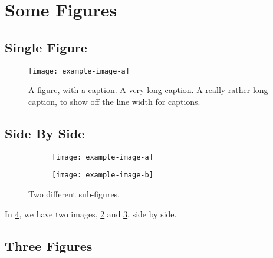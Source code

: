 
\section{Some Figures}

\subsection{Single Figure}

\begin{figure}[!ht]
	\centering
	\texttt{[image: example-image-a]}
	\caption{A figure, with a caption. A very long caption. A really rather long caption, to show off the line width for captions.}
	\label{fig1:single_image}
\end{figure}


\subsection{Side By Side}

\begin{figure}[!ht]
	\centering
	\begin{subfigure}[t]{.40\textwidth}
		\centering
		\texttt{[image: example-image-a]}
		\label{subfig1:left_subimage}
	\end{subfigure}
	\hspace{.10\textwidth} %
	\begin{subfigure}[t]{.40\textwidth}
		\centering
		\texttt{[image: example-image-b]}
		\label{subfig1:right_subimage}
	\end{subfigure}
	\caption{Two different sub-figures.}
	\label{fig1:two_images}
\end{figure}

In \ref{fig1:two_images}, we have two images, \ref{subfig1:left_subimage} and \ref{subfig1:right_subimage}, side by side.


\clearpage
\subsection{Three Figures}


